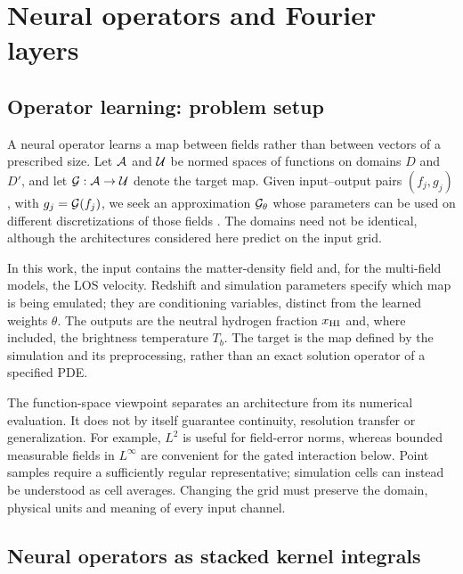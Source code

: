 \section{Neural operators and Fourier layers}
\label{sec:neural-operators}

\subsection{Operator learning: problem setup}
\label{sec:setup}

A neural operator learns a map between fields rather than between vectors of a prescribed size. Let $\mathcal{A}$ and $\mathcal{U}$ be normed spaces of functions on domains $D$ and $D'$, and let $\mathcal{G}:\mathcal{A}\to\mathcal{U}$ denote the target map. Given input--output pairs $(f_j,g_j)$, with $g_j=\mathcal{G}(f_j)$, we seek an approximation $\mathcal{G}_\theta$ whose parameters can be used on different discretizations of those fields \citep{kovachki2023neural}. The domains need not be identical, although the architectures considered here predict on the input grid.

In this work, the input contains the matter-density field and, for the multi-field models, the LOS velocity. Redshift and simulation parameters specify which map is being emulated; they are conditioning variables, distinct from the learned weights $\theta$. The outputs are the neutral hydrogen fraction $x_{\mathrm{HI}}$ and, where included, the brightness temperature $T_b$. The target is the map defined by the simulation and its preprocessing, rather than an exact solution operator of a specified PDE.

The function-space viewpoint separates an architecture from its numerical evaluation. It does not by itself guarantee continuity, resolution transfer or generalization. For example, $L^2$ is useful for field-error norms, whereas bounded measurable fields in $L^\infty$ are convenient for the gated interaction below. Point samples require a sufficiently regular representative; simulation cells can instead be understood as cell averages. Changing the grid must preserve the domain, physical units and meaning of every input channel.

\subsection{Neural operators as stacked kernel integrals}
\label{sec:neural-operator-layers}

